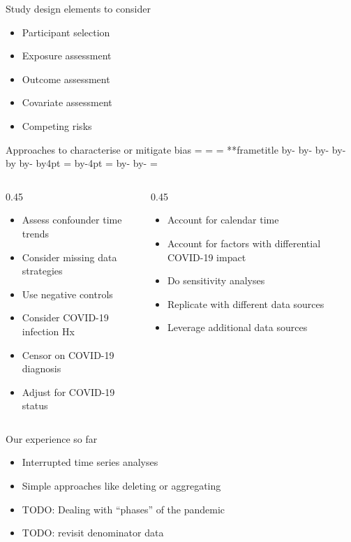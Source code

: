 \documentclass[aspectratio=169,12pt]{beamer} %
\makeatletter
\newif\ifsidebartheme
\newcommand*{\calculatespace}{%
    \contentheight=\paperheight%
    \ifx\beamer@frametitle\@empty%
        \setbox\@tempboxa=\box\voidb@x%
      \else%
        \setbox\@tempboxa=\vbox{%
          \vbox{}%
          {\parskip0pt\usebeamertemplate***{frametitle}}%
        }%
        \ifsidebartheme%
          \advance\contentheight by-1em%
        \fi%
      \fi%
    \advance\contentheight by-\ht\@tempboxa%
    \advance\contentheight by-\dp\@tempboxa%
    \advance\contentheight by-\beamer@frametopskip%
    \ifbeamer@plainframe%
    \contentbottom=0pt%
    \else%
    \advance\contentheight by-\headheight%
    \advance\contentheight by\headdp%
    \advance\contentheight by-\footheight%
    \advance\contentheight by4pt%
    \contentbottom=\footheight%
    \advance\contentbottom by-4pt%
    \fi%
    \contentwidth=\paperwidth%
    \ifbeamer@plainframe%
    \contentleft=0pt%
    \else%
    \advance\contentwidth by-\beamer@rightsidebar%
    \advance\contentwidth by-\beamer@leftsidebar\relax%
    \contentleft=\beamer@leftsidebar%
    \fi%
}
\makeatother
\begin{document}
\begin{frame}{Study design elements to consider}
	\begin{itemize}
		\item Participant selection
		\item Exposure assessment
		\item Outcome assessment
		\item Covariate assessment
		\item Competing risks
	\end{itemize}
\end{frame}

\begin{frame}{Approaches to characterise or mitigate bias}
\calculatespace%
\begin{columns}
\begin{column}{0.45\contentwidth}
	\begin{itemize}
		\item Assess confounder time trends
		\item Consider missing data strategies
		\item Use negative controls
		\item Consider COVID-19 infection Hx
		\item Censor on COVID-19 diagnosis
		\item Adjust for COVID-19 status
	\end{itemize}
\end{column}
\begin{column}{0.45\contentwidth}
	\begin{itemize}
		\item Account for calendar time
		\item Account for factors with differential COVID-19 impact
		\item Do sensitivity analyses
		\item Replicate with different data sources
		\item Leverage additional data sources
	\end{itemize}
\end{column}
\end{columns}
\end{frame}

\begin{frame}{Our experience so far}
	\begin{itemize}
		\item Interrupted time series analyses
		\item Simple approaches like deleting or aggregating
		\item TODO: Dealing with ``phases'' of the pandemic
		\item TODO: revisit denominator data
	\end{itemize}
\end{frame}
\end{document}
